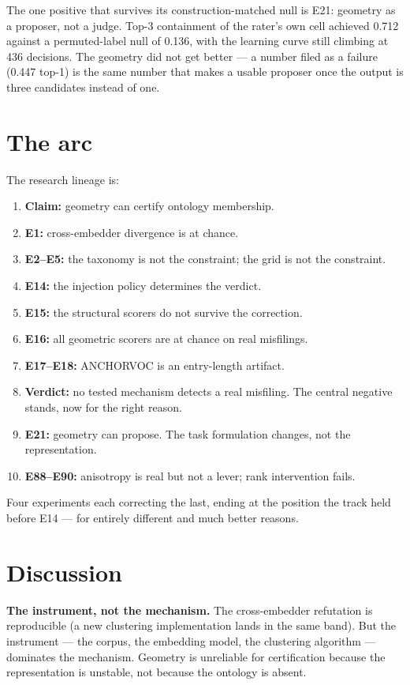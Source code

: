 \documentclass[11pt]{article}
\begin{document}
The one positive that survives its construction-matched null is E21:
geometry as a proposer, not a judge. Top-3 containment of the rater's own
cell achieved 0.712 against a permuted-label null of 0.136, with the
learning curve still climbing at 436 decisions. The geometry did not get
better --- a number filed as a failure (0.447 top-1) is the same number
that makes a usable proposer once the output is three candidates instead of
one.

\section{The arc}

The research lineage is:

\begin{enumerate}
\item \textbf{Claim:} geometry can certify ontology membership.
\item \textbf{E1:} cross-embedder divergence is at chance.
\item \textbf{E2--E5:} the taxonomy is not the constraint; the grid is not
the constraint.
\item \textbf{E14:} the injection policy determines the verdict.
\item \textbf{E15:} the structural scorers do not survive the correction.
\item \textbf{E16:} all geometric scorers are at chance on real misfilings.
\item \textbf{E17--E18:} ANCHORVOC is an entry-length artifact.
\item \textbf{Verdict:} no tested mechanism detects a real misfiling. The
central negative stands, now for the right reason.
\item \textbf{E21:} geometry can propose. The task formulation changes,
not the representation.
\item \textbf{E88--E90:} anisotropy is real but not a lever; rank
intervention fails.
\end{enumerate}

Four experiments each correcting the last, ending at the position the track
held before E14 --- for entirely different and much better reasons.

\section{Discussion}

\textbf{The instrument, not the mechanism.} The cross-embedder refutation
is reproducible (a new clustering implementation lands in the same band).
But the instrument --- the corpus, the embedding model, the clustering
algorithm --- dominates the mechanism. Geometry is unreliable for
certification because the representation is unstable, not because the
ontology is absent.
\end{document}
